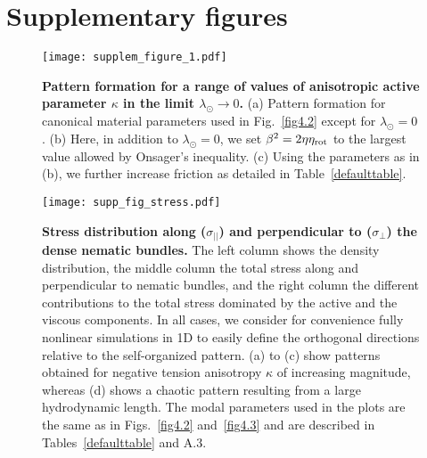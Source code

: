 \section{Supplementary figures} \label{appendix_1_sec_9}

\begin{figure}[p]
	\centering
	\texttt{[image: supplem\_figure\_1.pdf]}
	\caption{\textbf{Pattern formation for a range of values of anisotropic active parameter $\kappa$ in the limit  $\lambda_{\odot} \rightarrow 0$.} (a) Pattern formation for canonical material parameters used in Fig.~\ref{fig4.2} except for  $\lambda_{\odot}=0$. (b) Here, in addition to  $\lambda_{\odot}=0$, we set $\beta^2 = 2\eta \eta_{\rm rot}$ to the largest value allowed by Onsager's inequality. (c) Using the parameters as in (b), we further increase friction as detailed in Table~\ref{defaulttable}.
	}
	\label{supplem_fig_1}
\end{figure}



\begin{figure}[p]
	\centering
	\texttt{[image: supp\_fig\_stress.pdf]}
		\caption{\textbf{Stress distribution along ($\sigma_{\vert\vert}$) and perpendicular to ($\sigma_{\perp}$) the dense nematic bundles.} The left column shows the density distribution, the middle column the total stress along and perpendicular to nematic bundles, and the right column the different contributions to the total stress dominated by  the active and the viscous components. In all cases, we consider for convenience fully nonlinear simulations in 1D to easily define the orthogonal directions relative to the self-organized pattern. (a) to (c) show patterns obtained for negative tension anisotropy $\kappa$ of increasing magnitude, whereas (d) shows a chaotic pattern resulting from a large hydrodynamic length. The modal parameters used in the plots are the same as in Figs.~\ref{fig4.2} and~\ref{fig4.3} and are described in Tables~\ref{defaulttable} and A.3. }
	\label{supplem_fig_2}
\end{figure}



